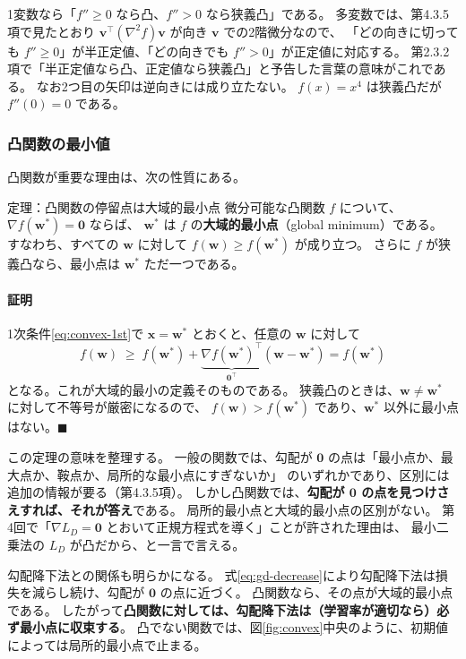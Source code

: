 1変数なら「$f'' \geq 0$ なら凸、$f'' > 0$ なら狭義凸」である。
多変数では、第4.3.5項で見たとおり $\bm{v}^\top(\nabla^2 f)\bm{v}$ が向き $\bm{v}$ での2階微分なので、
「どの向きに切っても $f'' \geq 0$」が半正定値、「どの向きでも $f'' > 0$」が正定値に対応する。
第2.3.2項で「半正定値なら凸、正定値なら狭義凸」と予告した言葉の意味がこれである。
なお2つ目の矢印は逆向きには成り立たない。
$f(x) = x^4$ は狭義凸だが $f''(0) = 0$ である。

\subsubsection{凸関数の最小値}

凸関数が重要な理由は、次の性質にある。

\begin{itembox}[l]{定理：凸関数の停留点は大域的最小点}
微分可能な凸関数 $f$ について、$\nabla f(\bm{w}^*) = \bm{0}$ ならば、
$\bm{w}^*$ は $f$ の\textbf{大域的最小点}（global minimum）である。
すなわち、すべての $\bm{w}$ に対して $f(\bm{w}) \geq f(\bm{w}^*)$ が成り立つ。
さらに $f$ が狭義凸なら、最小点は $\bm{w}^*$ ただ一つである。
\end{itembox}

\paragraph{証明}
1次条件\eqref{eq:convex-1st}で $\bm{x} = \bm{w}^*$ とおくと、任意の $\bm{w}$ に対して
\begin{equation*}
  f(\bm{w}) \;\geq\; f(\bm{w}^*) + \underbrace{\nabla f(\bm{w}^*)^\top}_{\bm{0}^\top} (\bm{w} - \bm{w}^*) = f(\bm{w}^*)
\end{equation*}
となる。これが大域的最小の定義そのものである。
狭義凸のときは、$\bm{w} \neq \bm{w}^*$ に対して不等号が厳密になるので、
$f(\bm{w}) > f(\bm{w}^*)$ であり、$\bm{w}^*$ 以外に最小点はない。\hfill $\blacksquare$

この定理の意味を整理する。
一般の関数では、勾配が $\bm{0}$ の点は「最小点か、最大点か、鞍点か、局所的な最小点にすぎないか」
のいずれかであり、区別には追加の情報が要る（第4.3.5項）。
しかし凸関数では、\textbf{勾配が $\bm{0}$ の点を見つけさえすれば、それが答え}である。
局所的最小点と大域的最小点の区別がない。
第4回で「$\nabla L_D = \bm{0}$ とおいて正規方程式を導く」ことが許された理由は、
最小二乗法の $L_D$ が凸だから、と一言で言える。

勾配降下法との関係も明らかになる。
式\eqref{eq:gd-decrease}により勾配降下法は損失を減らし続け、勾配が $\bm{0}$ の点に近づく。
凸関数なら、その点が大域的最小点である。
したがって\textbf{凸関数に対しては、勾配降下法は（学習率が適切なら）必ず最小点に収束する}。
凸でない関数では、図\ref{fig:convex}中央のように、初期値によっては局所的最小点で止まる。


